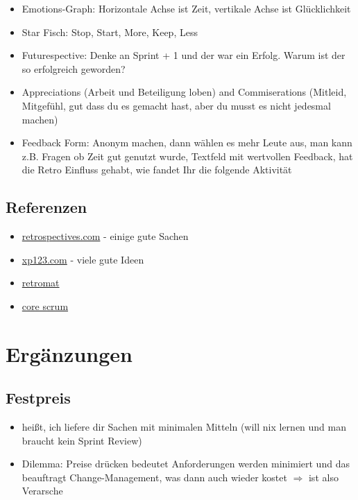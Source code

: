 \begin{itemize}
\begin{itemize}
    \end{itemize}
  \item Emotions-Graph: Horizontale Achse ist Zeit, vertikale Achse ist Glücklichkeit
  \item Star Fisch: Stop, Start, More, Keep, Less
  \item Futurespective: Denke an Sprint + 1 und der war ein Erfolg. Warum ist der so erfolgreich
    geworden?
  \item Appreciations (Arbeit und Beteiligung loben) and Commiserations (Mitleid, Mitgefühl, gut
    dass du es gemacht hast, aber du musst es nicht jedesmal machen)
  \item Feedback Form: Anonym machen, dann wählen es mehr Leute aus, man kann z.B. Fragen ob Zeit
    gut genutzt wurde, Textfeld mit wertvollen Feedback, hat die Retro Einfluss gehabt, wie
    fandet Ihr die folgende Aktivität
\end{itemize}


\subsection{Referenzen}
\begin{itemize}
  \item \href{http://retrospectives.com/}{retrospectives.com} - einige gute Sachen
  \item
    \href{http://xp123.com/articles/patterns-for-iteration-retrospectives/}{xp123.com} - viele
    gute Ideen
  \item \href{http://plans-for-retrospectives.com}{retromat}
  \item \href{https://www.scrumalliance.org/why-scrum/core-scrum-values-roles}{core scrum}
\end{itemize}
\pagebreak


\section{Ergänzungen}
\subsection{Festpreis}
\begin{itemize}
  \item heißt, ich liefere dir Sachen mit minimalen Mitteln (will nix lernen und man braucht kein Sprint Review)
  \item Dilemma: Preise drücken bedeutet Anforderungen werden minimiert und das beauftragt
    Change-Management, was dann auch wieder kostet $\Rightarrow$ ist also Verarsche
\end{itemize}


